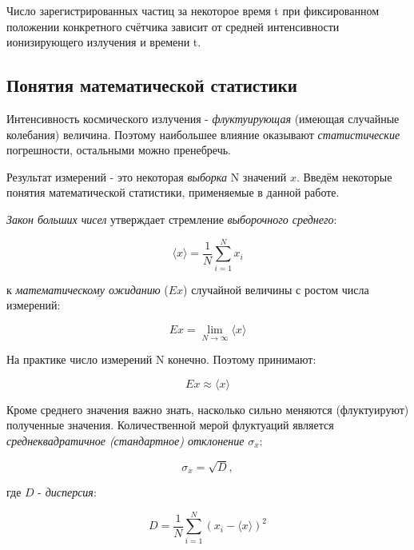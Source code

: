 \documentclass{report}
\begin{document}
	Число зарегистрированных частиц за некоторое время t при фиксированном  положении  конкретного  счётчика зависит от средней интенсивности ионизирующего излучения и времени t. 
	
	\subsection*{Понятия математической статистики}
	
	\hspace{4mm} Интенсивность космического излучения - \textit{флуктуирующая} (имеющая случайные колебания) величина. Поэтому наибольшее влияние оказывают \textit{статистические} погрешности, остальными можно пренебречь.
	
	Результат измерений - это некоторая \textit{выборка} N значений $x$. Введём некоторые понятия математической статистики, применяемые в данной работе.
	
	\textit{Закон больших чисел} утверждает стремление \textit{выборочного среднего}:
	
	\begin{equation}
		\langle x \rangle = \frac{1}{N} \sum_{i=1}^{N}x_{i}
	\end{equation}
	
	к \textit{математическому ожиданию} ($Ex$) случайной величины с ростом числа измерений:
	
	\begin{equation}
		Ex = \lim_{N \rightarrow \infty} \langle x \rangle 
	\end{equation}
	
	На практике число измерений N конечно. Поэтому принимают:
	
	\begin{equation}
		Ex \approx \langle x \rangle 
	\end{equation}
	
	Кроме среднего значения важно знать, насколько сильно меняются (флуктуируют) полученные значения. Количественной мерой флуктуаций является\textit{ среднеквадратичное (стандартное) отклонение} $\sigma_x$:
	
	\begin{equation}
		\sigma_x = \sqrt{D},
	\end{equation}
	
	где $D$ - \textit{дисперсия}:
	
	\begin{equation}
		D = \frac{1}{N} \sum_{i=1}^{N} (x_{i} - \langle x \rangle)^{2}
	\end{equation}
	
\end{document}
